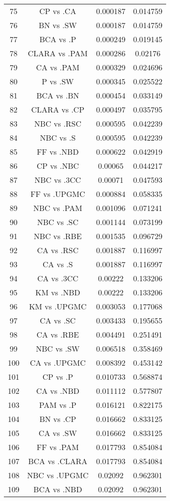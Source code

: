 \documentclass[a4paper,10pt]{article}
\begin{document}
\begin{landscape}
\begin{table}[!htp]
\begin{tabular}{cccc}
75&CP vs .CA&0.000187&0.014759\\
76&BN vs .SW&0.000187&0.014759\\
77&BCA vs .P&0.000249&0.019145\\
78&CLARA vs .PAM&0.000286&0.02176\\
79&CA vs .PAM&0.000329&0.024696\\
80&P vs .SW&0.000345&0.025522\\
81&BCA vs .BN&0.000454&0.033149\\
82&CLARA vs .CP&0.000497&0.035795\\
83&NBC vs .RSC&0.000595&0.042239\\
84&NBC vs .S&0.000595&0.042239\\
85&FF vs .NBD&0.000622&0.042919\\
86&CP vs .NBC&0.00065&0.044217\\
87&NBC vs .3CC&0.00071&0.047593\\
88&FF vs .UPGMC&0.000884&0.058335\\
89&NBC vs .PAM&0.001096&0.071241\\
90&NBC vs .SC&0.001144&0.073199\\
91&NBC vs .RBE&0.001535&0.096729\\
92&CA vs .RSC&0.001887&0.116997\\
93&CA vs .S&0.001887&0.116997\\
94&CA vs .3CC&0.00222&0.133206\\
95&KM vs .NBD&0.00222&0.133206\\
96&KM vs .UPGMC&0.003053&0.177068\\
97&CA vs .SC&0.003433&0.195655\\
98&CA vs .RBE&0.004491&0.251491\\
99&NBC vs .SW&0.006518&0.358469\\
100&CA vs .UPGMC&0.008392&0.453142\\
101&CP vs .P&0.010733&0.568874\\
102&CA vs .NBD&0.011112&0.577807\\
103&PAM vs .P&0.016121&0.822175\\
104&BN vs .CP&0.016662&0.833125\\
105&CA vs .SW&0.016662&0.833125\\
106&FF vs .PAM&0.017793&0.854084\\
107&BCA vs .CLARA&0.017793&0.854084\\
108&NBC vs .UPGMC&0.02092&0.962301\\
109&BCA vs .NBD&0.02092&0.962301\\

\end{tabular}
\end{table}
\end{landscape}
\end{document}

